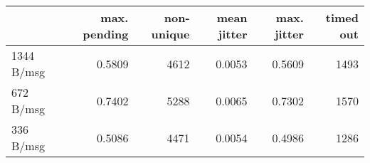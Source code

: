 \begin{tabular}{l|rrrrr}
\rowcolor{gray!50}
 & max. pending & non-unique & mean jitter & max. jitter & timed out\\\hline
1344 B/msg & 0.5809 & 4612 & 0.0053 & 0.5609 & 1493 \\
672 B/msg & 0.7402 & 5288 & 0.0065 & 0.7302 & 1570 \\
336 B/msg & 0.5086 & 4471 & 0.0054 & 0.4986 & 1286 \\
\end{tabular}
